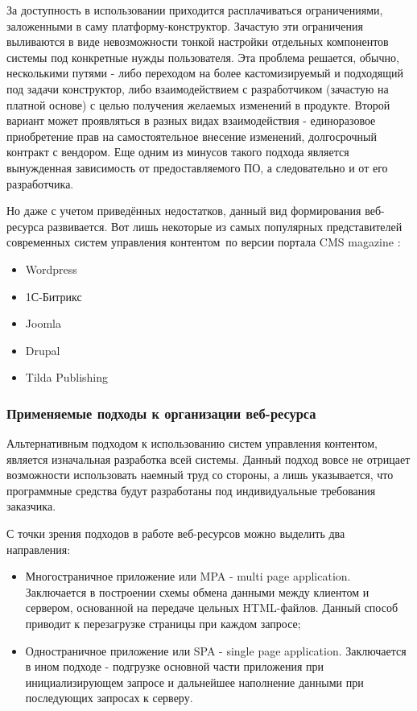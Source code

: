         За доступность в использовании приходится расплачиваться ограничениями, заложенными в саму платформу-конструктор.
        Зачастую эти ограничения выливаются в виде невозможности тонкой настройки отдельных компонентов системы под конкретные нужды пользователя.
        Эта проблема решается, обычно, несколькими путями - либо переходом на более кастомизируемый и подходящий под задачи конструктор, либо взаимодействием с разработчиком (зачастую на платной основе) с целью получения желаемых изменений в продукте.
        Второй вариант может проявляться в разных видах взаимодействия - единоразовое приобретение прав на самостоятельное внесение изменений, долгосрочный контракт с вендором.
        Еще одним из минусов такого подхода является вынужденная зависимость от предоставляемого ПО, а следовательно и от его разработчика.

        Но даже с учетом приведённых недостатков, данный вид формирования веб-ресурса развивается.
        Вот лишь некоторые из самых популярных представителей современных систем управления контентом по версии портала CMS magazine \cite{}:
        \begin{itemize}
            \item Wordpress
            \item 1С-Битрикс
            \item Joomla
            \item Drupal
            \item Tilda Publishing
        \end{itemize}

    \subsubsection{Применяемые подходы к организации веб-ресурса}
        Альтернативным подходом к использованию систем управления контентом, является изначальная разработка всей системы.
        Данный подход вовсе не отрицает возможности использовать наемный труд со стороны, а лишь указывается, что программные средства будут разработаны под индивидуальные требования заказчика.

        С точки зрения подходов в работе веб-ресурсов можно выделить два направления:
        \begin{itemize}
            \item Многостраничное приложение или MPA - multi page application.
            Заключается в построении схемы обмена данными между клиентом и сервером, основанной на передаче цельных HTML-файлов.
            Данный способ приводит к перезагрузке страницы при каждом запросе;
            \item Одностраничное приложение или SPA - single page application.
            Заключается в ином подходе - подгрузке основной части приложения при инициализирующем запросе и дальнейшее наполнение данными при последующих запросах к серверу.
        \end{itemize}

